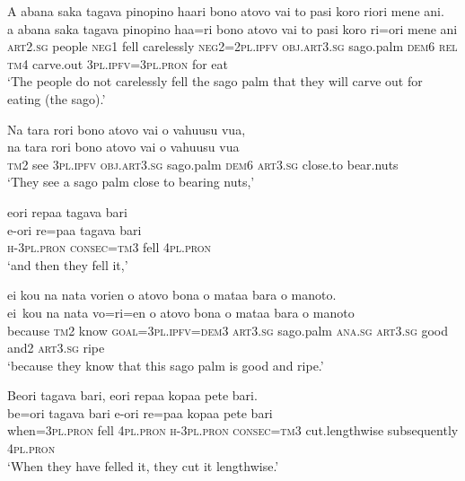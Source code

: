 \ea\label{ex:text2-43}
A abana saka tagava pinopino haari bono atovo vai to pasi koro riori mene ani.\\
\gll a	abana	saka	tagava	pinopino	haa=ri	bono	atovo	vai	to	pasi	koro	ri=ori	mene	ani\\
     \textsc{art}2.\textsc{sg}	people	\textsc{neg}1	fell	carelessly	\textsc{neg}2=2\textsc{pl}.\textsc{ipfv}	\textsc{obj}.\textsc{art}3.\textsc{sg}	sago.palm	\textsc{dem}6	\textsc{rel}	\textsc{tm}4	carve.out	3\textsc{pl}.\textsc{ipfv}=3\textsc{pl}.\textsc{pron}	for	eat\\
\glt `The people do not carelessly fell the sago palm that they will carve out for eating (the sago).'
\z

\ea\label{ex:text2-44}
Na tara rori bono atovo vai o vahuusu vua,\\
\gll na	tara	rori	bono	atovo	vai	o	vahuusu	vua\\
     \textsc{tm}2	see	3\textsc{pl}.\textsc{ipfv}	\textsc{obj}.\textsc{art}3.\textsc{sg}	sago.palm	\textsc{dem}6	\textsc{art}3.\textsc{sg}	close.to	bear.nuts\\
\glt `They see a sago palm close to bearing nuts,'
\z

\ea\label{ex:text2-45}
eori repaa tagava bari\\
\gll e-ori	re=paa	tagava	bari\\
     \textsc{h}-3\textsc{pl}.\textsc{pron}	\textsc{consec}=\textsc{tm}3	fell	4\textsc{pl}.\textsc{pron}\\
\glt `and then they fell it,'
\z

\ea\label{ex:text2-46}
ei kou na nata vorien o atovo bona o mataa bara o manoto.\\
\gll ei~kou	na	nata	vo=ri=en	o	atovo	bona	o	mataa	bara	o	manoto\\
     because	\textsc{tm}2	know	\textsc{goal}=3\textsc{pl}.\textsc{ipfv}=\textsc{dem}3	\textsc{art}3.\textsc{sg}	sago.palm	\textsc{ana}.\textsc{sg}	\textsc{art}3.\textsc{sg}	good	and2	\textsc{art}3.\textsc{sg}	ripe\\
\glt `because they know that this sago palm is good and ripe.'
\z

\ea\label{ex:text2-47}
Beori tagava bari, eori repaa kopaa pete bari.\\
\gll be=ori	tagava	bari	e-ori	re=paa	kopaa	pete	bari\\
     when=3\textsc{pl}.\textsc{pron}	fell	4\textsc{pl}.\textsc{pron}	\textsc{h}-3\textsc{pl}.\textsc{pron}	\textsc{consec}=\textsc{tm}3	cut.lengthwise	subsequently	4\textsc{pl}.\textsc{pron}\\
\glt `When they have felled it, they cut it lengthwise.'
\z

